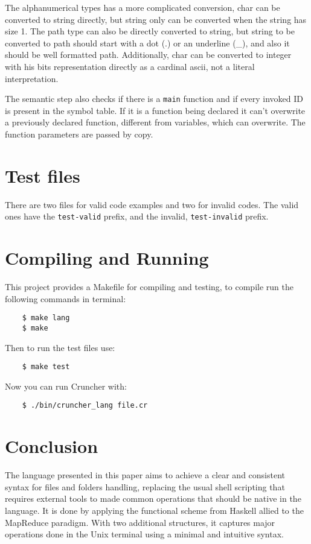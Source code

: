 \documentclass{article}
\begin{document}
The alphanumerical types has a more complicated conversion, char can be
converted to string directly, but string only can be converted when the string
has size 1.  The path type can also be directly converted to string, but string
to be converted to path should start with a dot (.) or an underline (_), and
also it should be well formatted path. Additionally, char can be converted to
integer with his bits representation directly as a cardinal ascii, not a
literal interpretation.

The semantic step also checks if there is a \texttt{main} function and if every
invoked ID is present in the symbol table. If it is a function being declared
it can't overwrite a previously declared function, different from variables,
which can overwrite. The function parameters are passed by copy.

\section{Test files}
\label{sec:test}
There are two files for valid code examples and two for invalid codes. The
valid ones have the \texttt{test-valid} prefix, and the invalid,
\texttt{test-invalid} prefix.

\section{Compiling and Running}%
\label{sec:compiling}
This project provides a Makefile for compiling and testing, to compile run the
following commands in terminal:
\begin{verbatim}
    $ make lang
    $ make
\end{verbatim}

Then to run the test files use:
\begin{verbatim}
    $ make test
\end{verbatim}

Now you can run Cruncher with:
\begin{verbatim}
    $ ./bin/cruncher_lang file.cr
\end{verbatim}

\section{Conclusion}
\label{sec:conclusion}
The language presented in this paper aims to achieve a clear and consistent
syntax for files and folders handling, replacing the usual shell scripting that
requires external tools to made common operations that should be native in the
language. It is done by applying the functional scheme from Haskell allied to
the MapReduce paradigm. With two additional structures, it captures major
operations done in the Unix terminal using a minimal and intuitive syntax.



\end{document}
